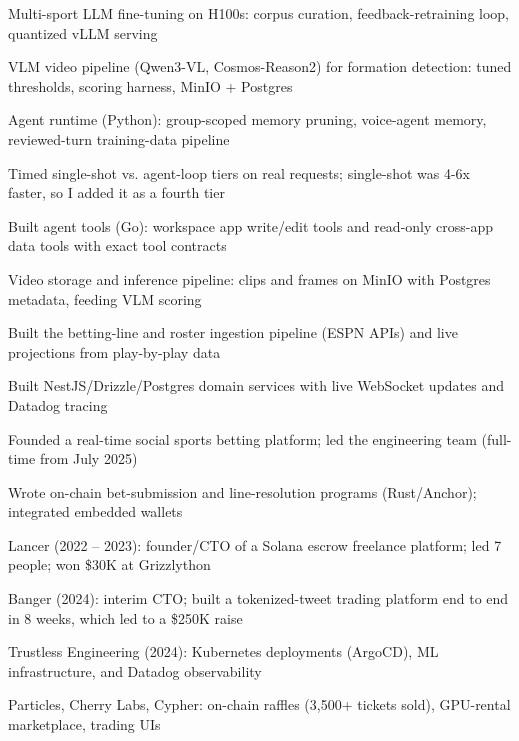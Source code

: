 \documentclass[print]{jack-resume}
\begin{document}
\begin{tightemize}
    \item Multi-sport LLM fine-tuning on H100s: corpus curation, feedback-retraining loop, quantized vLLM serving
    \item VLM video pipeline (Qwen3-VL, Cosmos-Reason2) for formation detection: tuned thresholds, scoring harness, MinIO + Postgres
    \item Agent runtime (Python): group-scoped memory pruning, voice-agent memory, reviewed-turn training-data pipeline
    \item Timed single-shot vs. agent-loop tiers on real requests; single-shot was 4-6x faster, so I added it as a fourth tier
    \item Built agent tools (Go): workspace app write/edit tools and read-only cross-app data tools with exact tool contracts
    \item Video storage and inference pipeline: clips and frames on MinIO with Postgres metadata, feeding VLM scoring
\end{tightemize}
\sectionsep

\begin{tightemize}
    \item Built the betting-line and roster ingestion pipeline (ESPN APIs) and live projections from play-by-play data
    \item Built NestJS/Drizzle/Postgres domain services with live WebSocket updates and Datadog tracing
    \item Founded a real-time social sports betting platform; led the engineering team (full-time from July 2025)
    \item Wrote on-chain bet-submission and line-resolution programs (Rust/Anchor); integrated embedded wallets
\end{tightemize}
\sectionsep

\begin{tightemize}
    \item Lancer (2022 – 2023): founder/CTO of a Solana escrow freelance platform; led 7 people; won \$30K at Grizzlython
    \item Banger (2024): interim CTO; built a tokenized-tweet trading platform end to end in 8 weeks, which led to a \$250K raise
    \item Trustless Engineering (2024): Kubernetes deployments (ArgoCD), ML infrastructure, and Datadog observability
    \item Particles, Cherry Labs, Cypher: on-chain raffles (3,500+ tickets sold), GPU-rental marketplace, trading UIs
\end{tightemize}
\sectionsep
\end{document}
